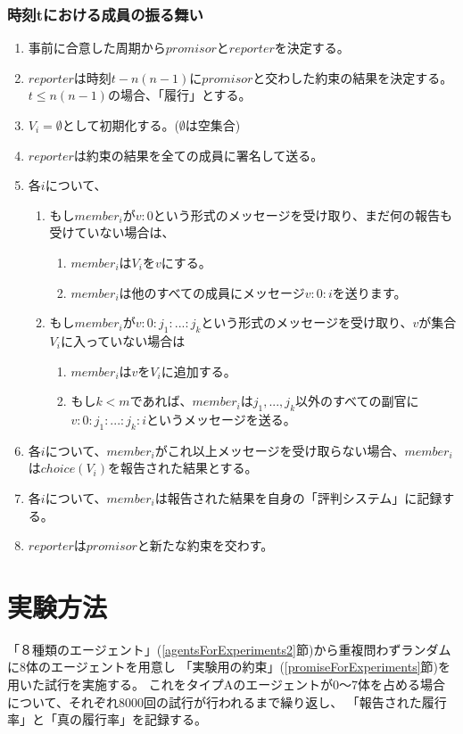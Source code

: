 \subsubsection{時刻tにおける成員の振る舞い}
\label{behaiverAtTimeT}
\begin{enumerate}
  \item 事前に合意した周期から$promisor$と$reporter$を決定する。
  \item $reporter$は時刻$t-n(n-1)$に$promisor$と交わした約束の結果を決定する。$t \leq n(n-1)$の場合、「履行」とする。
  \item $V_i=\emptyset$として初期化する。($\emptyset$は空集合)
  \item $reporter$は約束の結果を全ての成員に署名して送る。
  \item 各$i$について、 
  \begin{enumerate}
    \item もし$member_i$が$v:0$という形式のメッセージを受け取り、まだ何の報告も受けていない場合は、
    \begin{enumerate}
      \item $member_i$は$ V_i$を${v}$にする。 
      \item $member_i$は他のすべての成員にメッセージ$v:0:i$を送ります。
    \end{enumerate}
    \item もし$member_i$が$v:0:j_1:...:j_k$という形式のメッセージを受け取り、$v$が集合$V_i$に入っていない場合は
    \begin{enumerate}
      \item $member_i$は$v$を$V_i$に追加する。
      \item もし$k<m$であれば、$member_i$は$j_1, ..., j_k$以外のすべての副官に$v:0:j_1:...:j_k:i$というメッセージを送る。
    \end{enumerate}
  \end{enumerate}
  \item 各$i$について、$member_i$がこれ以上メッセージを受け取らない場合、$member_i$は$choice(V_i)$を報告された結果とする。
  \item 各$i$について、$member_i$は報告された結果を自身の「評判システム」に記録する。
  \item $reporter$は$promisor$と新たな約束を交わす。
\end{enumerate}

\section{実験方法}
  「８種類のエージェント」(\ref{agentsForExperiments2}節)から重複問わずランダムに8体のエージェントを用意し
  「実験用の約束」(\ref{promiseForExperiments}節)を用いた試行を実施する。
  これをタイプAのエージェントが0〜7体を占める場合について、それぞれ8000回の試行が行われるまで繰り返し、
  「報告された履行率」と「真の履行率」を記録する。

